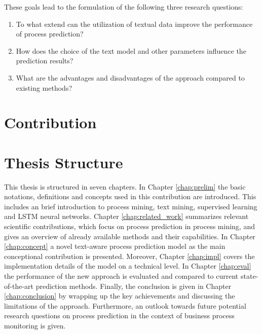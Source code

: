 These goals lead to the formulation of the following three research questions:

\begin{enumerate}
	\item To what extend can the utilization of textual data improve the performance of process prediction?
	\item How does the choice of the text model and other parameters influence the prediction results?
	\item What are the advantages and disadvantages of the approach compared to existing methods?
\end{enumerate}



\section{Contribution}



\section{Thesis Structure}

This thesis is structured in seven chapters.
In Chapter \ref{chap:prelim} the basic notations, definitions and concepts used in this contribution are introduced.
This includes an brief introduction to process mining, text mining, supervised learning and LSTM neural networks.
Chapter \ref{chap:related_work} summarizes relevant scientific contributions, which focus on process prediction in process mining, and gives an overview of already available methods and their capabilities.
In Chapter \ref{chap:concept} a novel text-aware process prediction model as the main conceptional contribution is presented.
Moreover, Chapter \ref{chap:impl} covers the implementation details of the model on a technical level.
In Chapter \ref{chap:eval} the performance of the new approach is evaluated and compared to current state-of-the-art prediction methods.
Finally, the conclusion is given in Chapter \ref{chap:conclusion} by wrapping up the key achievements and discussing the limitations of the approach.
Furthermore, an outlook towards future potential research questions on process prediction in the context of business process monitoring is given.